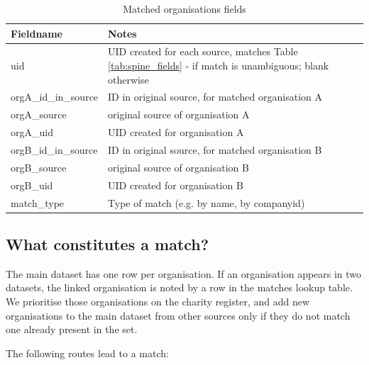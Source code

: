 \documentclass{article}
\begin{document}
\begin{table}[h]
  \centering
  \begin{tabularx}{\textwidth}{|l|X|}
    \hline
Fieldname &	Notes \\ \hline \hline
uid &	UID created for each source, matches Table \ref{tab:spine_fields} - if match is unambiguous; blank otherwise\\ \hline

orgA\_id\_in\_source &  ID in original source, for matched organisation A\\ \hline
orgA\_source & original source of organisation A\\ \hline
orgA\_uid & UID created for organisation A\\ \hline
orgB\_id\_in\_source & ID in original source, for matched organisation B\\ \hline
orgB\_source & original source of organisation B\\ \hline
orgB\_uid & UID created for organisation B\\ \hline
match\_type & Type of match (e.g. by name, by companyid)\\ \hline

\end{tabularx}
\caption{Matched organisations fields}
\label{tab:match_fields}
\end{table}


\clearpage
\subsection{What constitutes a match?}
\label{sec:match}

The main dataset has one row per organisation. If an organisation appears in two datasets, 
the linked organisation is noted by a row in the matches lookup table. We prioritise those organisations on the 
charity register, and add new organisations to the main dataset from other sources only if they do not match one already present in the set. 

The following routes lead to a match:
\end{document}
